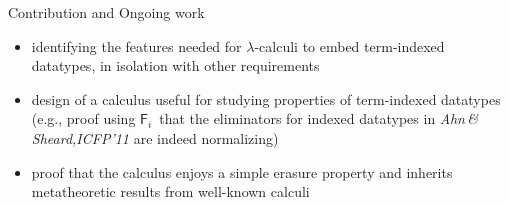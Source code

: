 \documentclass[final]{beamer}
\newcommand{\Fi}{\ensuremath{\mathsf{F}_{\!i}}}
\begin{document}
\begin{frame}[fragile]
\begin{columns}[t]
\begin{column}{.315\linewidth}
\begin{block}{Contribution and Ongoing work}
\begin{itemize}
\item identifying the features needed for $\lambda$-calculi 
    to embed term-indexed datatypes, in isolation with other
    requirements %
\item design of a calculus useful for studying properties of
    term-indexed datatypes
    {\normalsize
	    (e.g., proof using \Fi\ that the eliminators for indexed datatypes
    	in \emph{Ahn\,\&\,Sheard,ICFP'11} are indeed normalizing) }
\item proof that the calculus enjoys a simple erasure property
    and inherits metatheoretic results from well-known calculi
\end{itemize}
\end{block}

\end{column}
\end{columns}

\end{frame}
\end{document}
